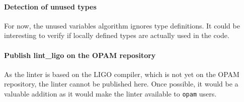 \documentclass[10pt,a4paper]{article}
\begin{document}
\paragraph{Detection of unused types}

For now, the unused variables algorithm ignores type definitions. It
could be interesting to verify if locally defined types are actually
used in the code.

\paragraph{Publish lint\_ligo on the OPAM repository}

As the linter is based on the LIGO compiler, which is not yet on the
OPAM repository, the linter cannot be published here. Once possible,
it would be a valuable addition as it would make the linter available
to \verb|opam| users.
\end{document}
